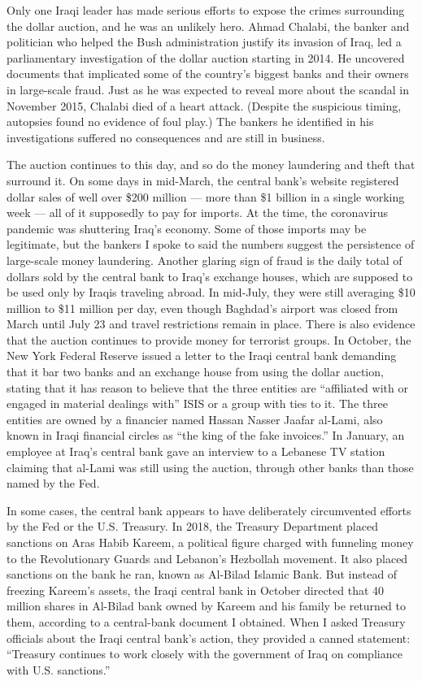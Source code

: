 Only one Iraqi leader has made serious efforts to expose the crimes
surrounding the dollar auction, and he was an unlikely hero. Ahmad
Chalabi, the banker and politician who helped the Bush administration
justify its invasion of Iraq, led a parliamentary investigation of the
dollar auction starting in 2014. He uncovered documents that implicated
some of the country's biggest banks and their owners in large-scale
fraud. Just as he was expected to reveal more about the scandal in
November 2015, Chalabi died of a heart attack. (Despite the suspicious
timing, autopsies found no evidence of foul play.) The bankers he
identified in his investigations suffered no consequences and are still
in business.

The auction continues to this day, and so do the money laundering and
theft that surround it. On some days in mid-March, the central bank's
website registered dollar sales of well over \$200 million --- more than
\$1 billion in a single working week --- all of it supposedly to pay for
imports. At the time, the coronavirus pandemic was shuttering Iraq's
economy. Some of those imports may be legitimate, but the bankers I
spoke to said the numbers suggest the persistence of large-scale money
laundering. Another glaring sign of fraud is the daily total of dollars
sold by the central bank to Iraq's exchange houses, which are supposed
to be used only by Iraqis traveling abroad. In mid-July, they were still
averaging \$10 million to \$11 million per day, even though Baghdad's
airport was closed from March until July 23 and travel restrictions
remain in place. There is also evidence that the auction continues to
provide money for terrorist groups. In October, the New York Federal
Reserve issued a letter to the Iraqi central bank demanding that it bar
two banks and an exchange house from using the dollar auction, stating
that it has reason to believe that the three entities are ``affiliated
with or engaged in material dealings with'' ISIS or a group with ties to
it. The three entities are owned by a financier named Hassan Nasser
Jaafar al-Lami, also known in Iraqi financial circles as ``the king of
the fake invoices.'' In January, an employee at Iraq's central bank gave
an interview to a Lebanese TV station claiming that al-Lami was still
using the auction, through other banks than those named by the Fed.

In some cases, the central bank appears to have deliberately
circumvented efforts by the Fed or the U.S. Treasury. In 2018, the
Treasury Department placed sanctions on Aras Habib Kareem, a political
figure charged with funneling money to the Revolutionary Guards and
Lebanon's Hezbollah movement. It also placed sanctions on the bank he
ran, known as Al-Bilad Islamic Bank. But instead of freezing Kareem's
assets, the Iraqi central bank in October directed that 40 million
shares in Al-Bilad bank owned by Kareem and his family be returned to
them, according to a central-bank document I obtained. When I asked
Treasury officials about the Iraqi central bank's action, they provided
a canned statement: ``Treasury continues to work closely with the
government of Iraq on compliance with U.S. sanctions.''

